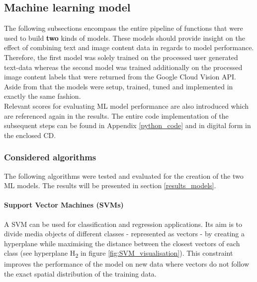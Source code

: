 \subsection{Machine learning model} \label{ml_model}
The following subsections encompass the entire pipeline of functions that were used to build \textbf{two} kinds of models. These models should provide insight on the effect of combining text and image content data in regards to model performance. Therefore, the first model was solely trained on the processed user generated text-data whereas the second model was trained additionally on the processed image content labels that were returned from the Google Cloud Vision API. Aside from that the models were setup, trained, tuned and implemented in exactly the same fashion.\\
Relevant scores for evaluating ML model performance are also introduced which are referenced again in the results. The entire code implementation of the subsequent steps can be found in Appendix \ref{python_code} and in digital form in the enclosed CD.

\subsubsection{Considered algorithms} \label{ml_algorithms}
The following algorithms were tested and evaluated for the creation of the two ML models. The results will be presented in section \ref{results_models}.

\paragraph*{Support Vector Machines (SVMs)}
A SVM can be used for classification and regression applications. Its aim is to divide media objects of different classes - represented as vectors - by creating a hyperplane while maximising the distance between the closest vectors of each class (see hyperplane H\textsubscript{2} in figure \ref{fig:SVM_visualisation}). This constraint improves the performance of the model on new data where vectors do not follow the exact spatial distribution of the training data.

